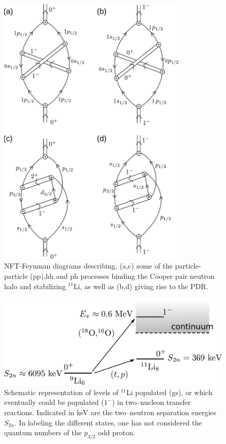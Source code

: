 \begin{subappendices}
\begin{figure}
\includegraphics[width=0.8\textwidth]{C8/figsC8/Nobel40Years-4b.pdf}
\caption{NFT-Feynman diagrams describing, (a,c) some of the particle-particle (pp),hh and ph processes binding the Cooper pair neutron halo 
and stabilizing $^{11}$Li, as well as  (b,d) giving rise to the PDR.}\label{fig6.I.2}
\end{figure}

\begin{figure}
\includegraphics[width=\textwidth]{C8/figsC8/figa3_newnew.pdf}
\caption{ Schematic representation of levels of $^{11}$Li populated (gs), or which  eventually could be populated ($1^-$)  in two--nucleon transfer reactions. Indicated in keV are the two--neutron
separation energies $S_{2n}$. In labeling the different states, one has not considered the quantum numbers of the $p_{3/2}$ odd proton. }\label{fig6.I.3} 
\end{figure}


\end{subappendices}
